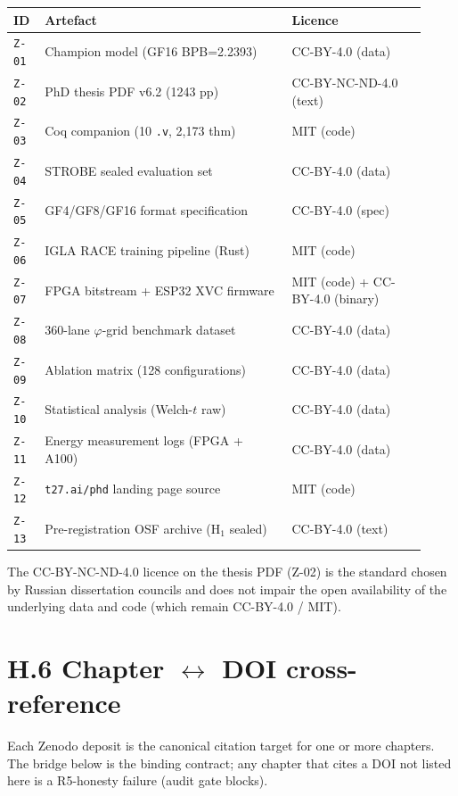 \begin{small}
\begin{longtable}{@{}p{0.07\linewidth}p{0.55\linewidth}p{0.30\linewidth}@{}}
\toprule
\textbf{ID} & \textbf{Artefact} & \textbf{Licence} \\
\midrule
\endhead
\texttt{Z-01} & Champion model (GF16 BPB=2.2393)              & CC-BY-4.0 (data) \\
\texttt{Z-02} & PhD thesis PDF v6.2 (1243 pp)                & CC-BY-NC-ND-4.0 (text) \\
\texttt{Z-03} & Coq companion (10 \texttt{.v}, 2{,}173 thm) & MIT (code) \\
\texttt{Z-04} & STROBE sealed evaluation set                 & CC-BY-4.0 (data) \\
\texttt{Z-05} & GF4/GF8/GF16 format specification            & CC-BY-4.0 (spec) \\
\texttt{Z-06} & IGLA RACE training pipeline (Rust)           & MIT (code) \\
\texttt{Z-07} & FPGA bitstream + ESP32 XVC firmware           & MIT (code) + CC-BY-4.0 (binary) \\
\texttt{Z-08} & 360-lane $\varphi$-grid benchmark dataset    & CC-BY-4.0 (data) \\
\texttt{Z-09} & Ablation matrix (128 configurations)         & CC-BY-4.0 (data) \\
\texttt{Z-10} & Statistical analysis (Welch-$t$ raw)         & CC-BY-4.0 (data) \\
\texttt{Z-11} & Energy measurement logs (FPGA + A100)        & CC-BY-4.0 (data) \\
\texttt{Z-12} & \texttt{t27.ai/phd} landing page source      & MIT (code) \\
\texttt{Z-13} & Pre-registration OSF archive (H$_1$ sealed)  & CC-BY-4.0 (text) \\
\bottomrule
\end{longtable}
\end{small}

\noindent The CC-BY-NC-ND-4.0 licence on the thesis PDF (Z-02) is the standard
chosen by Russian dissertation councils and does not impair the open
availability of the underlying data and code (which remain CC-BY-4.0 / MIT).

\section*{H.6 Chapter $\leftrightarrow$ DOI cross-reference}

\noindent Each Zenodo deposit is the canonical citation target for one or
more chapters. The bridge below is the binding contract; any chapter that
cites a DOI not listed here is a R5-honesty failure (audit gate blocks).

